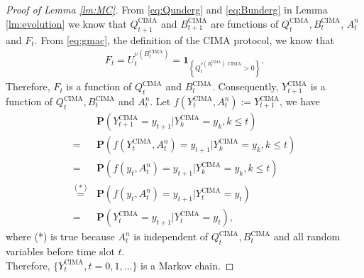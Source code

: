 \documentclass[onecolumn,draftcls]{IEEEtran}
\newcommand{\g}{\text{CIMA}}
\begin{document}
\section{}
\label{app:lm3}
\begin{proof}[Proof of Lemma \ref{lm:MC}]
From \eqref{eq:Qunderg} and \eqref{eq:Bunderg} in Lemma \ref{lm:evolution} we know that
$Q^{\g}_{t+1}$ and $B^{\g}_{t+1}$ are functions of 
$Q^{\g}_{t},B^{\g}_{t}$, $A^n_t$ and $F_t$.
From \eqref{eq:gmac}, the definition of the $\g$ protocol, we know that
\begin{align*}
F_t = U^{v(B^{\g}_t)}_t
 = \mathbf{1}_{\left\{Q^{v(B^{\g}_t),\g}_{t}>0\right\}}.
\end{align*}
Therefore, $F_t$ is a function of $Q^{\g}_{t}$ and $B^{\g}_{t}$.
Consequently, $Y^{\g}_{t+1}$ is a function of $Q^{\g}_{t},B^{\g}_{t}$ and $A^n_t$.
Let $f(Y^{\g}_t,A^n_t):=Y^{\g}_{t+1}$, we have
\begin{align*}
&\mathbf{P}(
Y^{\g}_{t+1} = y_{t+1} 
|Y^{\g}_k = y_k, k\leq t)\\
= & \mathbf{P}(
f(Y^{\g}_t,A^n_t) = y_{t+1} 
|Y^{\g}_k = y_k, k\leq t)\\
= & \mathbf{P}(
f(y_t,A^n_t) = y_{t+1} 
|Y^{\g}_k = y_k, k\leq t)\\
\stackrel{(*)}{=}  & \mathbf{P}(
f(y_t,A^n_t) = y_{t+1} 
|Y^{\g}_t = y_t)\\
=&\mathbf{P}(
Y^{\g}_t = y_{t+1} 
|Y^{\g}_t = y_t),
\end{align*}
where (*) is true because $A^n_t$ is independent of $Q^{\g}_{t},B^{\g}_{t}$ and all random variables before time slot $t$.
\\
Therefore, $\{Y^{\g}_t, t=0,1,\dots\}$ is a Markov chain.

\end{proof}
\end{document}
